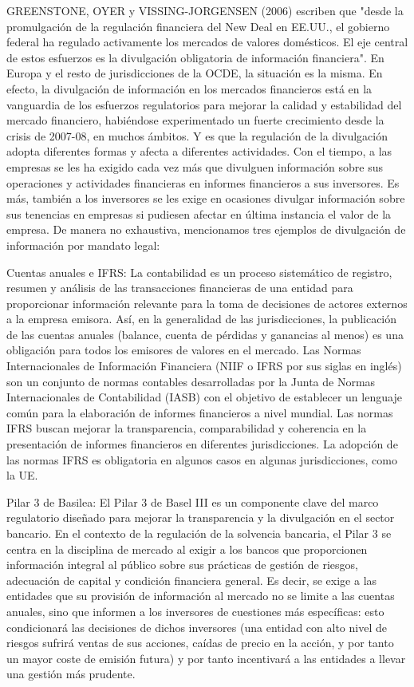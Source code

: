 \documentclass[10pt,a4paper]{article}
\begin{document}
GREENSTONE, OYER y VISSING-JORGENSEN (2006) escriben que "desde la promulgación de la regulación financiera del New Deal en EE.UU., el gobierno federal ha regulado activamente los mercados de valores domésticos. El eje central de estos esfuerzos es la divulgación obligatoria de información financiera". En Europa y el resto de jurisdicciones de la OCDE, la situación es la misma. En efecto, la divulgación de información en los mercados financieros está en la vanguardia de los esfuerzos regulatorios para mejorar la calidad y estabilidad del mercado financiero, habiéndose experimentado un fuerte crecimiento desde la crisis de 2007-08, en muchos ámbitos. Y es que la regulación de la divulgación adopta diferentes formas y afecta a diferentes actividades. Con el tiempo, a las empresas se les ha exigido cada vez más que divulguen información sobre sus operaciones y actividades financieras en informes financieros a sus inversores. Es más, también a los inversores se les exige en ocasiones divulgar información sobre sus tenencias en empresas si pudiesen afectar en última instancia el valor de la empresa. De manera no exhaustiva, mencionamos tres ejemplos de divulgación de información por mandato legal:

Cuentas anuales e IFRS: La contabilidad es un proceso sistemático de registro, resumen y análisis de las transacciones financieras de una entidad para proporcionar información relevante para la toma de decisiones de actores externos a la empresa emisora. Así, en la generalidad de las jurisdicciones, la publicación de las cuentas anuales (balance, cuenta de pérdidas y ganancias al menos) es una obligación para todos los emisores de valores en el mercado. Las Normas Internacionales de Información Financiera (NIIF o IFRS por sus siglas en inglés) son un conjunto de normas contables desarrolladas por la Junta de Normas Internacionales de Contabilidad (IASB) con el objetivo de establecer un lenguaje común para la elaboración de informes financieros a nivel mundial. Las normas IFRS buscan mejorar la transparencia, comparabilidad y coherencia en la presentación de informes financieros en diferentes jurisdicciones. La adopción de las normas IFRS es obligatoria en algunos casos en algunas jurisdicciones, como la UE.

Pilar 3 de Basilea: El Pilar 3 de Basel III es un componente clave del marco regulatorio diseñado para mejorar la transparencia y la divulgación en el sector bancario. En el contexto de la regulación de la solvencia bancaria, el Pilar 3 se centra en la disciplina de mercado al exigir a los bancos que proporcionen información integral al público sobre sus prácticas de gestión de riesgos, adecuación de capital y condición financiera general. Es decir, se exige a las entidades que su provisión de información al mercado no se limite a las cuentas anuales, sino que informen a los inversores de cuestiones más específicas: esto condicionará las decisiones de dichos inversores (una entidad con alto nivel de riesgos sufrirá ventas de sus acciones, caídas de precio en la acción, y por tanto un mayor coste de emisión futura) y por tanto incentivará a las entidades a llevar una gestión más prudente.
\end{document}
